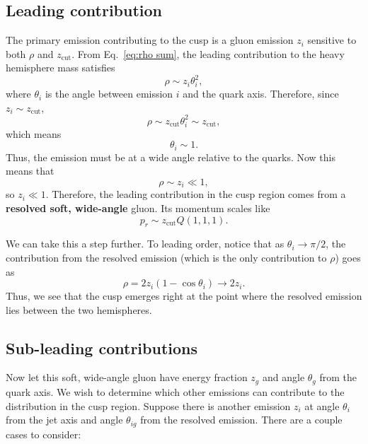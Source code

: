 \documentclass[11pt,twoside,reqno]{amsart}
\theoremstyle{plain}
\theoremstyle{remark}
\theoremstyle{definition}
\theoremstyle{remark}
\theoremstyle{definition}
\theoremstyle{definition}
\newcommand{\zcut}{z_\mathrm{cut}}
\begin{document}
\subsection{Leading contribution}

	The primary emission contributing to the cusp is a gluon emission $z_i$ sensitive to both $\rho$ and $\zcut$. From Eq.\ \ref{eq:rho sum}, the leading contribution to the heavy hemisphere mass satisfies
	\begin{equation}
		\rho \sim z_i \theta_i^2,
	\end{equation}
	where $\theta_i$ is the angle between emission $i$ and the quark axis. Therefore, since $z_i \sim \zcut$,
	\begin{equation}
		\rho \sim \zcut \theta_i^2 \sim \zcut,
	\end{equation}
	which means
	\begin{equation}
		\theta_i \sim 1.
	\end{equation}
	Thus, the emission must be at a wide angle relative to the quarks. Now this means that
	\begin{equation}
		\rho \sim z_i \ll 1,
	\end{equation}
	so $z_i \ll 1$. Therefore, the leading contribution in the cusp region comes from a \textbf{resolved soft, wide-angle} gluon. Its momentum scales like
	\begin{equation}
		p_r \sim \zcut Q (1, 1, 1).
	\end{equation}

	We can take this a step further. To leading order, notice that as $\theta_i \to \pi/2$, the contribution from the resolved emission (which is the only contribution to $\rho$) goes as
	\begin{equation}
		\rho = 2 z_i (1 - \cos\theta_i) \to 2z_i.
	\end{equation}
	Thus, we see that the cusp emerges right at the point where the resolved emission lies between the two hemispheres.


\subsection{Sub-leading contributions}\label{sec:sub-leading}

	Now let this soft, wide-angle gluon have energy fraction $z_g$ and angle $\theta_g$ from the quark axis. We wish to determine which other emissions can contribute to the distribution in the cusp region. Suppose there is another emission $z_i$ at angle $\theta_i$ from the jet axis and angle $\theta_{ig}$ from the resolved emission. There are a couple cases to consider:
\end{document}
